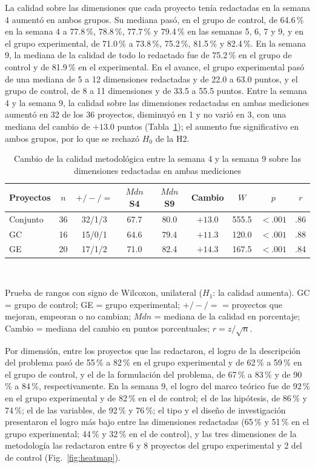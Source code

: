 \documentclass[journal]{IEEEtran}
\begin{document}
La calidad sobre las dimensiones que cada proyecto tenía redactadas en la semana 4 aumentó en ambos grupos. Su mediana pasó, en el grupo de control, de 64.6\,\% en la semana 4 a 77.8\,\%, 78.8\,\%, 77.7\,\% y 79.4\,\% en las semanas 5, 6, 7 y 9, y en el grupo experimental, de 71.0\,\% a 73.8\,\%, 75.2\,\%, 81.5\,\% y 82.4\,\%. En la semana 9, la mediana de la calidad de todo lo redactado fue de 75.2\,\% en el grupo de control y de 81.9\,\% en el experimental. En el avance, el grupo experimental pasó de una mediana de 5 a 12 dimensiones redactadas y de 22.0 a 63.0 puntos, y el grupo de control, de 8 a 11 dimensiones y de 33.5 a 55.5 puntos. Entre la semana 4 y la semana 9, la calidad sobre las dimensiones redactadas en ambas mediciones aumentó en 32 de los 36 proyectos, disminuyó en 1 y no varió en 3, con una mediana del cambio de $+13.0$ puntos (Tabla~\ref{tab:wilcoxon}); el aumento fue significativo en ambos grupos, por lo que se rechazó $H_0$ de la H2.

\begin{table}[!t]
\caption{Cambio de la calidad metodológica entre la semana 4 y la semana 9 sobre las dimensiones redactadas en ambas mediciones}
\label{tab:wilcoxon}
\centering
\scriptsize
\setlength{\tabcolsep}{3.5pt}
\begin{tabular}{lcccccccc}
\toprule
Proyectos & $n$ & $+/-/=$ & $Mdn$ S4 & $Mdn$ S9 & Cambio & $W$ & $p$ & $r$ \\
\midrule
Conjunto & 36 & 32/1/3 & 67.7 & 80.0 & $+13.0$ & 555.5 & $<.001$ & .86 \\
GC & 16 & 15/0/1 & 64.6 & 79.4 & $+11.3$ & 120.0 & $<.001$ & .88 \\
GE & 20 & 17/1/2 & 71.0 & 82.4 & $+14.3$ & 167.5 & $<.001$ & .84 \\
\bottomrule
\end{tabular}
\\[2pt]
\raggedright\scriptsize Prueba de rangos con signo de Wilcoxon, unilateral ($H_1$: la calidad aumenta). GC = grupo de control; GE = grupo experimental; $+/-/=$ = proyectos que mejoran, empeoran o no cambian; $Mdn$ = mediana de la calidad en porcentaje; Cambio = mediana del cambio en puntos porcentuales; $r = z/\sqrt{n}$.
\end{table}

Por dimensión, entre los proyectos que las redactaron, el logro de la descripción del problema pasó de 55\,\% a 82\,\% en el grupo experimental y de 62\,\% a 59\,\% en el grupo de control, y el de la formulación del problema, de 67\,\% a 83\,\% y de 90\,\% a 84\,\%, respectivamente. En la semana 9, el logro del marco teórico fue de 92\,\% en el grupo experimental y de 82\,\% en el de control; el de las hipótesis, de 86\,\% y 74\,\%; el de las variables, de 92\,\% y 76\,\%; el tipo y el diseño de investigación presentaron el logro más bajo entre las dimensiones redactadas (65\,\% y 51\,\% en el grupo experimental; 44\,\% y 32\,\% en el de control), y las tres dimensiones de la metodología las redactaron entre 6 y 8 proyectos del grupo experimental y 2 del de control (Fig.~\ref{fig:heatmap}).
\end{document}
